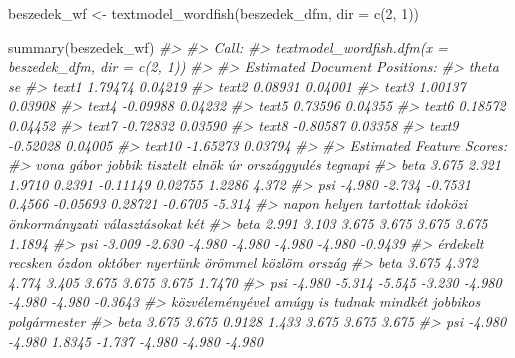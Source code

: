 \documentclass[
]{book}
\newenvironment{Shaded}{\begin{snugshade}}{\end{snugshade}}
\newcommand{\AttributeTok}[1]{\textcolor[rgb]{0.77,0.63,0.00}{#1}}
\newcommand{\CommentTok}[1]{\textcolor[rgb]{0.56,0.35,0.01}{\textit{#1}}}
\newcommand{\DecValTok}[1]{\textcolor[rgb]{0.00,0.00,0.81}{#1}}
\newcommand{\FunctionTok}[1]{\textcolor[rgb]{0.00,0.00,0.00}{#1}}
\newcommand{\NormalTok}[1]{#1}
\newcommand{\OtherTok}[1]{\textcolor[rgb]{0.56,0.35,0.01}{#1}}
\begin{document}
\begin{Shaded}
\begin{Highlighting}[]
\NormalTok{beszedek\_wf }\OtherTok{\textless{}{-}} \FunctionTok{textmodel\_wordfish}\NormalTok{(beszedek\_dfm, }\AttributeTok{dir =} \FunctionTok{c}\NormalTok{(}\DecValTok{2}\NormalTok{, }\DecValTok{1}\NormalTok{))}

\FunctionTok{summary}\NormalTok{(beszedek\_wf)}
\CommentTok{\#\textgreater{} }
\CommentTok{\#\textgreater{} Call:}
\CommentTok{\#\textgreater{} textmodel\_wordfish.dfm(x = beszedek\_dfm, dir = c(2, 1))}
\CommentTok{\#\textgreater{} }
\CommentTok{\#\textgreater{} Estimated Document Positions:}
\CommentTok{\#\textgreater{}           theta      se}
\CommentTok{\#\textgreater{} text1   1.79474 0.04219}
\CommentTok{\#\textgreater{} text2   0.08931 0.04001}
\CommentTok{\#\textgreater{} text3   1.00137 0.03908}
\CommentTok{\#\textgreater{} text4  {-}0.09988 0.04232}
\CommentTok{\#\textgreater{} text5   0.73596 0.04355}
\CommentTok{\#\textgreater{} text6   0.18572 0.04452}
\CommentTok{\#\textgreater{} text7  {-}0.72832 0.03590}
\CommentTok{\#\textgreater{} text8  {-}0.80587 0.03358}
\CommentTok{\#\textgreater{} text9  {-}0.52028 0.04005}
\CommentTok{\#\textgreater{} text10 {-}1.65273 0.03794}
\CommentTok{\#\textgreater{} }
\CommentTok{\#\textgreater{} Estimated Feature Scores:}
\CommentTok{\#\textgreater{}        vona  gábor  jobbik tisztelt    elnök      úr országgyulés tegnapi}
\CommentTok{\#\textgreater{} beta  3.675  2.321  1.9710   0.2391 {-}0.11149 0.02755       1.2286   4.372}
\CommentTok{\#\textgreater{} psi  {-}4.980 {-}2.734 {-}0.7531   0.4566 {-}0.05693 0.28721      {-}0.6705  {-}5.314}
\CommentTok{\#\textgreater{}       napon helyen tartottak idoközi önkormányzati választásokat     két}
\CommentTok{\#\textgreater{} beta  2.991  3.103     3.675   3.675         3.675         3.675  1.1894}
\CommentTok{\#\textgreater{} psi  {-}3.009 {-}2.630    {-}4.980  {-}4.980        {-}4.980        {-}4.980 {-}0.9439}
\CommentTok{\#\textgreater{}      érdekelt recsken  ózdon október nyertünk örömmel közlöm  ország}
\CommentTok{\#\textgreater{} beta    3.675   4.372  4.774   3.405    3.675   3.675  3.675  1.7470}
\CommentTok{\#\textgreater{} psi    {-}4.980  {-}5.314 {-}5.545  {-}3.230   {-}4.980  {-}4.980 {-}4.980 {-}0.3643}
\CommentTok{\#\textgreater{}      közvéleményével  amúgy     is tudnak mindkét jobbikos polgármester}
\CommentTok{\#\textgreater{} beta           3.675  3.675 0.9128  1.433   3.675    3.675        3.675}
\CommentTok{\#\textgreater{} psi           {-}4.980 {-}4.980 1.8345 {-}1.737  {-}4.980   {-}4.980       {-}4.980}
\end{Highlighting}
\end{Shaded}
\end{document}
